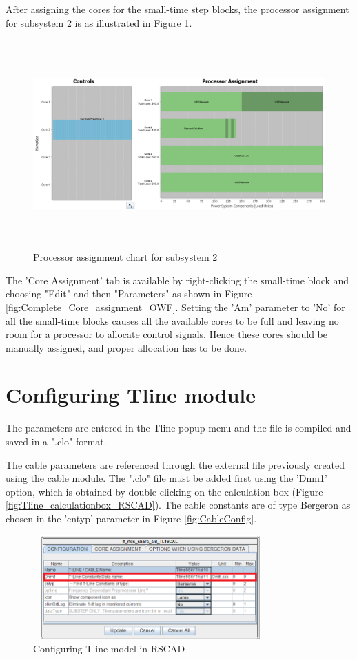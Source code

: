 After assigning the cores for the small-time step blocks, the processor assignment for subsystem 2 is as illustrated in Figure \ref{fig:subsystem2_processor}.

\begin{figure}[H]
\centering
    \includegraphics[height = 8cm,width = 17cm]{Diagrams/Chapter_4/subsystem2_processor.PNG}
    \caption{Processor assignment chart for subsystem 2}
    \label{fig:subsystem2_processor}
\end{figure}

The 'Core Assignment' tab is available by right-clicking the small-time block and choosing "Edit" and then "Parameters" as shown in Figure \ref{fig:Complete_Core_assignment_OWF}. Setting the 'Am' parameter to 'No' for all the small-time blocks causes all the available cores to be full and leaving no room for a processor to allocate control signals. Hence these cores should be manually assigned, and proper allocation has to be done.


\section{Configuring Tline module}\label{config_Tline}
The parameters are entered in the Tline popup menu and the file is compiled and saved in a ".clo" format.

The cable parameters are referenced through the external file previously created using the cable module. %
The ".clo" file must be added first using the 'Dnm1' option, which is obtained by double-clicking on the calculation box (Figure \ref{fig:Tline_calculationbox_RSCAD}). The cable constants are of type Bergeron as chosen in the 'cntyp' parameter in Figure \ref{fig:CableConfig}.

\begin{figure}
  \centering
  \includegraphics[height = 4cm,width = 9cm]{Diagrams/Chapter_4/TlineParaBlock_side1_mark.png}  
  \caption{Configuring Tline model in RSCAD}
  \label{fig:Tline_config_RSCAD}
\end{figure}